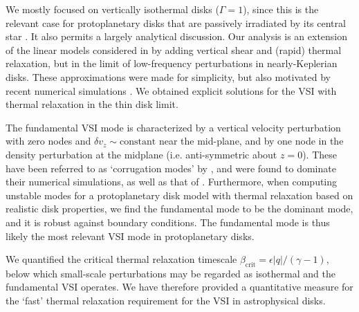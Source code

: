 
We mostly focused on vertically isothermal disks ($\Gamma=1$), since
this is the relevant case for protoplanetary disks that are passively irradiated by its central star 
\citep{chiang97}. It also permits a largely analytical discussion.
Our analysis is an extension of the linear models considered in
\cite{lubow93} by  adding vertical shear and (rapid) thermal
relaxation, but in the limit of low-frequency perturbations in
nearly-Keplerian disks. These approximations were made for simplicity,
but also motivated by recent numerical simulations
\citep{nelson13}. We obtained explicit solutions for the VSI with
thermal relaxation in the thin disk limit. 


The fundamental VSI mode is characterized by a vertical velocity
perturbation with zero nodes and $\delta v_z\sim\mathrm{constant}$
near the mid-plane, and by one node in the density perturbation at the
midplane  (i.e. anti-symmetric about $z=0$).  These have been referred
to as `corrugation modes' by \cite{nelson13}, and were found to
dominate their numerical simulations, as well as that of
\cite{stoll14}. Furthermore, when computing unstable modes for a
protoplanetary disk model with thermal relaxation based on realistic
disk properties, we find the fundamental mode to be the dominant mode,
 and it is robust against boundary conditions. The fundamental mode is
 thus likely the most relevant VSI mode in protoplanetary disks.  

We quantified the critical thermal relaxation timescale 
$\beta_\mathrm{crit}=\epsilon|q|/(\gamma-1)$, below which small-scale
perturbations may be regarded as isothermal and the fundamental VSI
operates. %
We have therefore provided a quantitative measure for the `fast'
thermal relaxation requirement for the VSI in astrophysical disks. 

